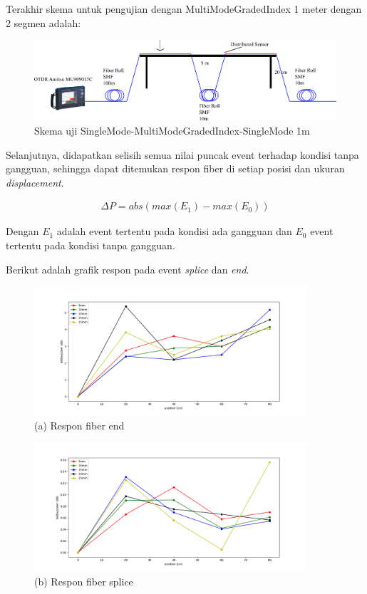 \documentclass[12pt]{article}
\begin{document}
	\newpage
	Terakhir skema untuk pengujian dengan MultiModeGradedIndex 1 meter dengan 2 segmen adalah:
	
	\begin{figure}[!h]
		\centering
		\captionsetup{justification=centering}
		\includegraphics[width=0.7\linewidth]{images/Bab_4/uji2_1m}
		\caption[Trace SMF-SMF]{\small{Skema uji SingleMode-MultiModeGradedIndex-SingleMode 1m}}
	\end{figure}
	
	Selanjutnya, didapatkan selisih semua nilai puncak event terhadap kondisi tanpa gangguan,
	sehingga dapat ditemukan respon fiber di setiap posisi dan ukuran \textit{displacement}.
	
	\begin{align}
		\Delta P = abs(max(E_1) - max(E_0))
	\end{align}
	
	Dengan $E_1$ adalah event tertentu pada kondisi ada gangguan dan $E_0$ event tertentu pada kondisi tanpa gangguan.
	
	Berikut adalah grafik respon pada event \textit{splice} dan \textit{end}.
	
	\begin{figure}[!h]
		\centering
		\captionsetup{justification=centering}
		\includegraphics[width=0.9\textwidth]{images/Bab_4/Bab_4_5f1}	
		\caption{\small{(a) Respon fiber end}}
	\end{figure}
	
	\begin{figure}[!h]
		\centering
		\captionsetup{justification=centering}
		\includegraphics[width=0.9\textwidth]{images/Bab_4/Bab_4_5f2}	
		\caption{\small{(b) Respon fiber splice}}
	\end{figure}
\end{document}

